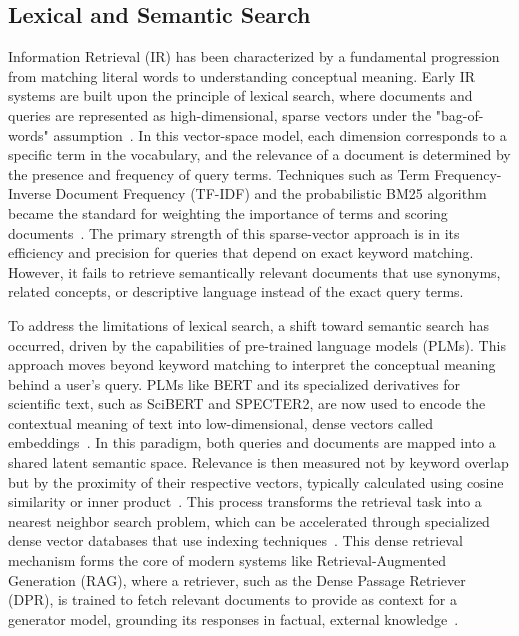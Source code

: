 \documentclass[journal]{./IEEE/IEEEtran}
\begin{document}
\subsection{Lexical and Semantic Search}
Information Retrieval (IR) has been characterized by a fundamental progression from matching literal words to understanding conceptual meaning. Early IR systems are built upon the principle of lexical search, where documents and queries are represented as high-dimensional, sparse vectors under the "bag-of-words" assumption~\cite{zhao_dense_2024}. In this vector-space model, each dimension corresponds to a specific term in the vocabulary, and the relevance of a document is determined by the presence and frequency of query terms. Techniques such as Term Frequency-Inverse Document Frequency (TF-IDF) and the probabilistic BM25 algorithm became the standard for weighting the importance of terms and scoring documents~\cite{zhao_dense_2024}. The primary strength of this sparse-vector approach is in its efficiency and precision for queries that depend on exact keyword matching. However, it fails to retrieve semantically relevant documents that use synonyms, related concepts, or descriptive language instead of the exact query terms.

To address the limitations of lexical search, a shift toward semantic search has occurred, driven by the capabilities of pre-trained language models (PLMs). This approach moves beyond keyword matching to interpret the conceptual meaning behind a user's query. PLMs like BERT and its specialized derivatives for scientific text, such as SciBERT and SPECTER2, are now used to encode the contextual meaning of text into low-dimensional, dense vectors called embeddings~\cite{mandikal_sparse_2024}. In this paradigm, both queries and documents are mapped into a shared latent semantic space. Relevance is then measured not by keyword overlap but by the proximity of their respective vectors, typically calculated using cosine similarity or inner product~\cite{zhao_dense_2024}. This process transforms the retrieval task into a nearest neighbor search problem, which can be accelerated through specialized dense vector databases that use indexing techniques~\cite{monir_vectorsearch_2024,zhao_chat2data_2024}. This dense retrieval mechanism forms the core of modern systems like Retrieval-Augmented Generation (RAG), where a retriever, such as the Dense Passage Retriever (DPR), is trained to fetch relevant documents to provide as context for a generator model, grounding its responses in factual, external knowledge~\cite{lewis_retrieval-augmented_2021}.
\end{document}
